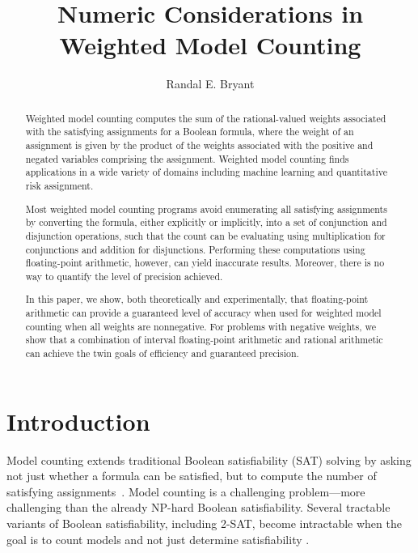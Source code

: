 \documentclass[letterpaper,USenglish,cleveref, autoref, thm-restate]{lipics-v2021}
\title{Numeric Considerations in Weighted Model Counting}
\author{Randal E. Bryant}{Computer Science Department, Carnegie Mellon University, Pittsburgh, PA 15213 USA}{Randy.Bryant@cs.cmu.edu}{https://orcid.org/0000-0001-5024-6613}{}
\begin{document}
\maketitle

\begin{abstract}
 Weighted model counting computes the sum of the rational-valued weights
  associated with the satisfying assignments for a Boolean formula,
  where the weight of an assignment is given by the product of the
  weights associated with the positive and negated variables
  comprising the assignment.  Weighted model counting finds
  applications in a wide variety of domains including machine learning
  and quantitative risk assignment.

  Most weighted model counting programs avoid enumerating all
  satisfying assignments by converting the formula, either explicitly or
  implicitly, into a set of conjunction and disjunction operations,
  such that the count can be evaluating using multiplication for
  conjunctions and addition for disjunctions.  Performing these
  computations using floating-point arithmetic, however, can yield
  inaccurate results.  Moreover, there is no way to quantify the
  level of precision achieved.

  In this paper, we show, both theoretically and experimentally, that
  floating-point arithmetic can provide a guaranteed level of accuracy
  when used for weighted model counting when all weights are
  nonnegative.  For problems with negative weights, we show that a
  combination of interval floating-point arithmetic and rational
  arithmetic can achieve the twin goals of efficiency and guaranteed
  precision.
\end{abstract}

\section{Introduction}

Model counting extends traditional Boolean satisfiability (SAT) solving by
asking not just whether a formula can be satisfied, but to compute the
number of satisfying assignments~\cite{gomes:hs:2009}.  Model counting is a challenging
problem---more challenging than the already NP-hard Boolean
satisfiability.  Several tractable variants of Boolean satisfiability,
including 2-SAT, become intractable when the goal is to count models
and not just determine satisfiability \cite{valiant:siam:1979}.
\end{document}

